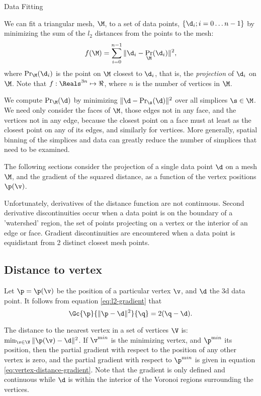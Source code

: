 \begin{plSection}{Data Fitting}
\label{sec:data-fitting}

We can fit a triangular mesh, $\M$, to a set of data points, $\{\d_i; i=0 \ldots n-1\}$
by minimizing the sum of the $l_2$ distances from the points to the mesh:
\begin{equation}
f(\M) = \sum_{i=0}^{n-1} \| \d_i - \Pr_\M (\d_i) \|^2 ,
\end{equation}
where $\Pr_\M (\d_i)$ is the point on $\M$ closest to $\d_i$,
that is, the {\em projection} of $\d_i$ on $\M$.
Note that $f:\Reals^{3n} \mapsto \Re$,
where $n$ is the number of vertices in $\M$.

We compute $\Pr_\M (\d)$ by minimizing  $\| \d - \Pr_\s (\d) \|^2$
over all simplices $\s \in \M$.
We need only consider the faces of $\M$,
those edges not in any face,
and the vertices not in any edge,
because the closest point on a face must at least
as the closest point on any of its edges,
and similarly for vertices.
More generally, spatial binning of the simplices and data can greatly
reduce the number of simplices that need to be examined.

The following sections consider the projection of a single
data point $\d$ on a mesh $\M$,
and the gradient of the squared distance,
as a function of the vertex positions $\p(\v)$.

Unfortunately, derivatives of the distance function are not continuous.
Second derivative discontinuities occur
when a data point is on the boundary
of a 'watershed' region, the set of points
projecting on a vertex or the interior of an edge or face.
Gradient discontinuities are encountered
when a data point is equidistant from 2 distinct closest mesh points.

\subsection{Distance to vertex}
\label{sec:Distance-to-vertex}

Let $\p = \p(\v)$ be the position of a particular vertex $\v$,
and $\d$ the 3d data point.
It follows from equation \ref{eq:l2-gradient} that
\begin{equation}
\label{eq:vertex-distance-gradient}
\Gc{\p}{\| \p - \d \|^2}{\q} = 2 ( \q - \d ).
\end{equation}

The distance to the nearest vertex in a set of vertices $\V$ is:
$\min_{\v \in \V} \| \p(\v) - \d \|^2$.
If $\v^{\mathrm min}$ is the minimizing vertex,
and
$\p^{\mathrm min}$ its position,
then the partial gradient with respect
to the position of any other vertex is zero,
and the partial gradient with respect to $\p^{\mathrm min}$
is given in equation \ref{eq:vertex-distance-gradient}.
Note that the gradient is only defined and continuous
while $\d$ is within the interior of the
Voronoi regions surrounding the vertices.


\end{plSection}

